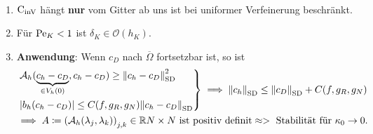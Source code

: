 \begin{remark}\
	\begin{enumerate}[label=\Alph*)]
		\item $ \operatorname{C_{\text{inV}}} $ hängt \textbf{nur} vom Gitter ab uns ist bei uniformer Verfeinerung beschränkt.
		\item Für $ \operatorname{Pe}_K < 1 $ ist $ \delta_K \in \mathcal{O}(h_K) $.
		\item \textbf{Anwendung}: Wenn $ c_D $ nach $ \overline{\Omega} $ fortsetzbar ist, so ist
		\begin{gather*}
			\begin{rcases}
				\mathcal{A}_h(\underbrace{c_h-c_D}_{\in V_h(0)}, c_h - c_D ) \geq \norm{c_h - c_D}_{\operatorname{\text{SD}}}^2 \\
				\abs{b_h(c_h-c_D)} \leq C(f,g_R, g_N) \norm{c_h - c_D}_{\operatorname{\text{SD}}}
			\end{rcases} \implies \norm{c_h}_{\operatorname{\text{SD}}} \leq \norm{c_D}_{\operatorname{\text{SD}}} + C(f,g_R,g_N)\\
			\implies A \coloneqq \left( \mathcal{A}_h(\lambda_j, \lambda_k) \right)_{j,k} \in \mathbb{R}{N \times N} \text{ ist positiv definit} \approx> \text{ Stabilität für } \kappa_0 \to 0.
		\end{gather*}
	\end{enumerate}
\end{remark}
